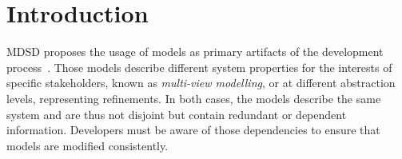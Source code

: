 \chapter{Introduction
}



\acl{MDSD} proposes the usage of models as primary artifacts of the %
development process~\cite{stahl2006a}. 
Those models describe different system properties for the interests of specific stakeholders, known as \emph{multi-view modelling}, or at different abstraction levels, representing refinements. In both cases, the models describe the same system and are thus not disjoint but contain redundant or dependent information. 
Developers must be aware of those dependencies to ensure that models are modified consistently. 

